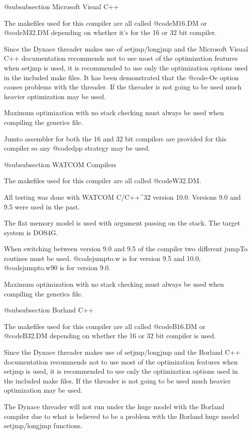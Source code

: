 @subsubsection Microsoft Visual C++

The makefiles used for this compiler are all called @code{M16.DM} or
@code{M32.DM} depending on whether it's for the 16 or 32 bit compiler.

Since the Dynace threader makes use of setjmp/longjmp and the Microsoft
Visual C++ documentation recommends not to use most of the optimization
features when setjmp is used, it is recommended to use only the
optimization options used in the included make files.  It has been
demonstrated that the @code{-Oe} option causes problems with the
threader.  If the threader is not going to be used much heavier
optimization may be used.

Maximum optimization with no stack checking must always be used when
compiling the generics file.

Jumto assembler for both the 16 and 32 bit compilers are provided for
this compiler so any @code{dpp} strategy may be used.

@subsubsection WATCOM Compilers

The makefiles used for this compiler are all called
@code{W32.DM}.

All testing was done with WATCOM C/C++^32 version 10.0.
Versions 9.0 and 9.5 were used in the past.

The flat memory model is used with argument passing on the stack.  The
target system is DOS4G.  

When switching between version 9.0 and 9.5 of the compiler two different
jumpTo routines must be used.  @code{jumpto.w} is for version 9.5 and
10.0, @code{jumpto.w90} is for version 9.0.

Maximum optimization with no stack checking must always be used when
compiling the generics file.

@subsubsection Borland C++

The makefiles used for this compiler are all called @code{B16.DM} or
@code{B32.DM} depending on whether the 16 or 32 bit compiler is used.

Since the Dynace threader makes use of setjmp/longjmp and the Borland C++
documentation recommends not to use most of the optimization features
when setjmp is used, it is recommended to use only the optimization
options used in the included make files.  If the threader is not going
to be used much heavier optimization may be used.

The Dynace threader will not run under the huge model with the Borland
compiler due to what is believed to be a problem with the Borland
huge model setjmp/longjmp functions.


